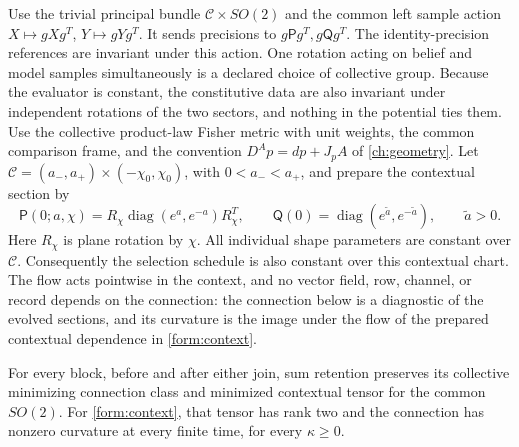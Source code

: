 Use the trivial principal bundle $\mathcal C\times SO(2)$ and the common
left sample action $X\mapsto gXg^T$, $Y\mapsto gYg^T$. It sends precisions
to $g\mathsf P g^T,g\mathsf Qg^T$. The identity-precision references are
invariant under this action. One rotation acting on belief and model samples simultaneously is a declared choice of collective group. Because the evaluator is constant, the constitutive data are also invariant under independent rotations of the two sectors, and nothing in the potential ties them. Use the collective product-law Fisher metric
with unit weights, the common comparison frame, and the convention
$D^A p=dp+J_pA$ of \cref{ch:geometry}. Let
$\mathcal C=(a_-,a_+)\times(-\chi_0,\chi_0)$, with $0<a_-<a_+$, and
prepare the contextual section by
\begin{equation}
 \mathsf P(0;a,\chi)
 =R_\chi\operatorname{diag}(e^a,e^{-a})R_\chi^T,\qquad
 \mathsf Q(0)=\operatorname{diag}(e^{\tilde a},e^{-\tilde a}),\qquad \tilde a>0.
 \label{form:context}
\end{equation}
Here $R_\chi$ is plane rotation by $\chi$. All individual shape parameters
are constant over $\mathcal C$. Consequently the selection schedule is
also constant over this contextual chart. The flow acts pointwise in the context, and no vector field, row, channel, or record depends on the connection: the connection below is a diagnostic of the evolved sections, and its curvature is the image under the flow of the prepared contextual dependence in \cref{form:context}.

For every block, before and after either join, sum retention preserves its
collective minimizing connection class and minimized contextual tensor for the common $SO(2)$.
For \cref{form:context}, that tensor has rank two and the connection has
nonzero curvature at every finite time, for every $\kappa\ge0$.


